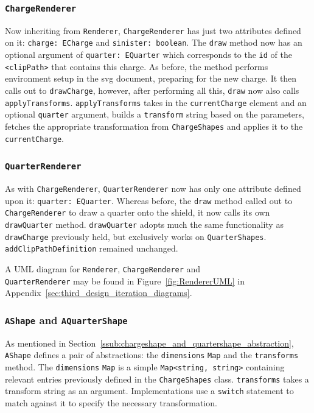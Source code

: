 \documentclass[nobib, a4paper, twoside, justified]{tufte-book}
\makeatletter
\newcommand{\svg}{\gls{svg}\@\xspace}
\newcommand{\charge}{\gls{charge}\@\xspace}
\makeatother
\begin{document}
\subsubsection{\texttt{ChargeRenderer}}%
\label{ssub:chargerenderer}

Now inheriting from \texttt{Renderer}, \texttt{ChargeRenderer} has just two attributes defined on
it: \texttt{charge: ECharge} and \texttt{sinister: boolean}. The \texttt{draw} method now has an
optional argument of \texttt{quarter: EQuarter} which corresponds to the \texttt{id} of the
\texttt{<clipPath>} that contains this \charge. As before, the method performs environment setup in
the \svg document, preparing for the new \charge. It then calls out to \texttt{drawCharge},
however, after performing all this, \texttt{draw} now also calls \texttt{applyTransforms}.
\texttt{applyTransforms} takes in the \texttt{currentCharge} element and an optional
\texttt{quarter} argument, builds a \texttt{transform} string based on the parameters, fetches the
appropriate transformation from \texttt{ChargeShapes} and applies it to the \texttt{currentCharge}.

\subsubsection{\texttt{QuarterRenderer}}%
\label{ssub:quarterrenderer}

As with \texttt{ChargeRenderer}, \texttt{QuarterRenderer} now has only one attribute defined upon it:
\texttt{quarter: EQuarter}. Whereas before, the \texttt{draw} method called out to
\texttt{ChargeRenderer} to draw a quarter onto the shield, it now calls its own
\texttt{drawQuarter} method. \texttt{drawQuarter} adopts much the same functionality as
\texttt{drawCharge} previously held, but exclusively works on \texttt{QuarterShapes}.
\texttt{addClipPathDefinition} remained unchanged.

A UML diagram for \texttt{Renderer}, \texttt{ChargeRenderer} and \\ \texttt{QuarterRenderer} may be
found in Figure~\ref{fig:RendererUML} in Appendix~\ref{sec:third_design_iteration_diagrams}.

\subsubsection{\texttt{AShape} and \texttt{AQuarterShape}}%
\label{ssub:ashape_and_aquartershape}

As mentioned in Section~\ref{ssub:chargeshape_and_quartershape_abstraction}, \texttt{AShape}
defines a pair of abstractions: the \texttt{dimensions} \texttt{Map} and the \texttt{transforms}
method. The \texttt{dimensions} \texttt{Map} is a simple \texttt{Map<string, string>} containing
relevant entries previously defined in the \texttt{ChargeShapes} class. \texttt{transforms} takes a
transform string as an argument. Implementations use a \texttt{switch} statement to match
against it to specify the necessary transformation.
\end{document}
